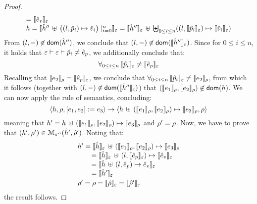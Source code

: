 \begin{proof}
$$\begin{array}{l}
   =  \symbeval{\sexpr_v}{\senv} \\
 \heap = \semexpr{\sheap'' \, \uplus \, \big((l, \sexprp_i) \mapsto \sexprv_i\big)\mid_{i = 0}^n}{\senv} 
     = \semexpr{\sheap''}{\senv} \dunion \biguplus_{0 \leq i \leq n} ((l, \symbeval{\sexprp_i}{\senv}) \mapsto \symbeval{\sexprv_i}{\senv})
\end{array}
$$
From  $(\loc, -) \not\in \domain(\sheap'')$, we conclude that $(\loc, -) \not\in \domain(\semexpr{\sheap''}{\senv})$. 
Since  for $0 \leq i \leq n$, it holds that $\senv \vdash \senv \vdash \sexprp_i \neq \sexpr_p$, 
we additionally conclude that: 
$$
  \forall_{0 \leq i \leq n}  \, \symbeval{\sexprp_i}{\senv} \neq \symbeval{\sexpr_p}{\senv} 
$$
Recalling that $\symbeval{\jsilexpr_2}{\store} = \symbeval{\sexpr_p}{\senv}$, we conclude that  
$
  \forall_{0 \leq i \leq n}  \, \symbeval{\sexprp_i}{\senv} \neq \symbeval{\jsilexpr_2}{\store}
$, from which it follows (together with $(\loc, -) \not\in \domain(\semexpr{\sheap''}{\senv})$) that 
$(\symbeval{\jsilexpr_1}{\store}, \symbeval{\jsilexpr_2}{\store}) \not\in \domain(\heap)$.
We can now apply the  rule of \jsil semantics, concluding: 
$$
   \semtrans{\heap, \store, [\jsilexpr_1, \jsilexpr_2] := \jsilexpr_3}
     {\heap \dunion (\symbeval{\jsilexpr_1}{\store}, \symbeval{\jsilexpr_2}{\store}) \mapsto \symbeval{\jsilexpr_3}{\store},  \store}
$$
meaning that $\heap' = \heap \dunion (\symbeval{\jsilexpr_1}{\store}, \symbeval{\jsilexpr_2}{\store}) \mapsto \symbeval{\jsilexpr_3}{\store}$ 
and $\store' = \store$. 
%
Now, we have to prove that $(\heap', \store') \in \smodels{\sheap', \sstore'}{\pc''}$.
Noting that:
$$
\begin{array}{l}
\heap' = \symbeval{\sheap}{\senv} \dunion (\symbeval{\jsilexpr_1}{\store}, \symbeval{\jsilexpr_2}{\store}) \mapsto \symbeval{\jsilexpr_3}{\store} \\ 
  \qquad = \symbeval{\sheap}{\senv} \dunion (\loc, \symbeval{\sexpr_p}{\senv}) \mapsto \symbeval{\sexpr_v}{\senv}  \\
    \qquad = \symbeval{\sheap \dunion (\loc, \sexpr_p) \mapsto \sexpr_v}{\senv}  \\
    \qquad = \symbeval{\sheap'}{\senv} \\[2pt]
 \store' = \store = \symbeval{\sstore}{\senv} = \symbeval{\sstore'}{\senv} 
\end{array}
$$
the result follows. 
\vspace{6pt}




\end{proof}
